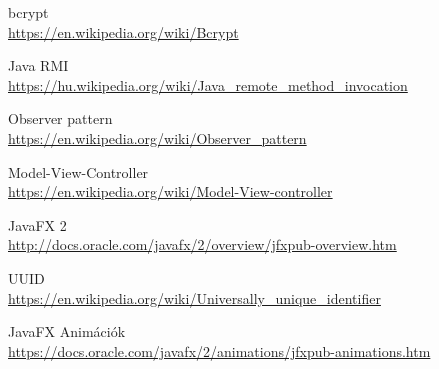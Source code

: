 \begin{thebibliography}{9}
bcrypt \\
\url{https://en.wikipedia.org/wiki/Bcrypt}

Java RMI \\
\url{https://hu.wikipedia.org/wiki/Java_remote_method_invocation}

Observer pattern \\
\url{https://en.wikipedia.org/wiki/Observer_pattern}

Model-View-Controller \\
\url{https://en.wikipedia.org/wiki/Model-View-controller}

JavaFX 2 \\
\url{http://docs.oracle.com/javafx/2/overview/jfxpub-overview.htm}

UUID \\
\url{https://en.wikipedia.org/wiki/Universally_unique_identifier}

JavaFX Animációk \\
\url{https://docs.oracle.com/javafx/2/animations/jfxpub-animations.htm}


\end{thebibliography}
